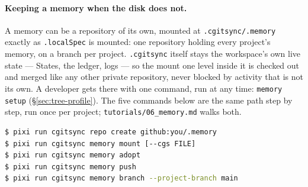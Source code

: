 \paragraph{Keeping a memory when the disk does
not.}\label{sec:memory-mount} A memory can be a
repository of its own, mounted at \texttt{.cgitsync/.memory} exactly as
\texttt{.localSpec} is mounted: one repository holding every project's
memory, on a branch per project. \texttt{.cgitsync} itself stays the
workspace's own live state --- States, the ledger, logs --- so the mount
one level inside it is checked out and merged like any other private
repository, never blocked by activity that is not its own. A developer gets
there with one command, run at any time: \texttt{memory setup}
(\S\ref{sec:tree-profile}). The five commands below are the same path
step by step, run once per project; \texttt{tutorials/06\_memory.md} walks
both.

\begin{lstlisting}[language=bash]
$ pixi run cgitsync repo create github:you/.memory
$ pixi run cgitsync memory mount [--cgs FILE]
$ pixi run cgitsync memory adopt
$ pixi run cgitsync memory push
$ pixi run cgitsync memory branch --project-branch main
\end{lstlisting}

